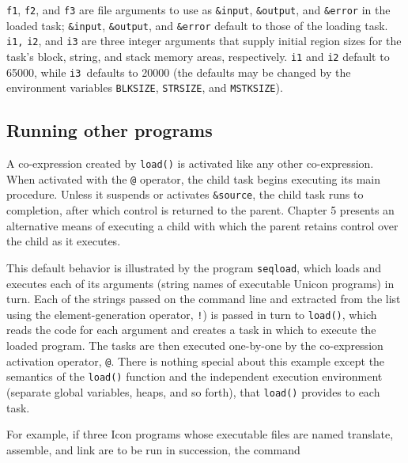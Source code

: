 {\texttt{f1}}, {\texttt{f2}},
and {\texttt{f3}}{ }are file
arguments to use as {\texttt{\&input}},
{\texttt{\&output}}, and
{\texttt{\&error}} in the loaded task;
{\texttt{\&input}},
{\texttt{\&output}}, and
{\texttt{\&error}}{\textrm{
}}default to those of the loading task.{\textrm{
}}{\texttt{i1,}} {\texttt{i2}},
and {\texttt{i3}} are three integer arguments that
supply initial region sizes for the task's block,
string, and stack memory areas, respectively.
{\texttt{i1}} and {\texttt{i2}}
default to 65000, while {\texttt{i3 }}defaults to
20000 (the defaults may be changed by the environment variables
{\texttt{BLKSIZE}},
{\texttt{STRSIZ}}\texttt{E}, and
{\texttt{MSTKSIZE}}). 

\subsection*{Running other programs}

A co-expression created by {\texttt{load()}} is
activated like any other co-expression. When activated with the
{\texttt{@}} operator, the child task begins
executing its main procedure. Unless it suspends or activates
{\texttt{\&source}}, the child task runs to
completion, after which control is returned to the parent. Chapter 5
presents an alternative means of executing a child with which the
parent retains control over the child as it executes. 

This default behavior is illustrated by the program
\texttt{seqload}, which loads and executes each
of its arguments (string names of executable Unicon programs) in turn.
Each of the strings passed on the command line and extracted from the
list using the element-generation operator,
{\texttt{!}}) is passed in turn to
{\texttt{load()}}, which reads the code for each argument
and creates a task in which to execute the loaded program. The tasks
are then executed one-by-one by the co-expression activation operator,
{\texttt{@}}. There is
nothing special about this example except the semantics of the
{\texttt{load()}} function and the independent
execution environment (separate global variables, heaps, and so forth),
that {\texttt{load()}} provides to each task. 


For example, if three Icon programs whose executable files are named
translate, assemble, and link are to be run in succession, the command 

